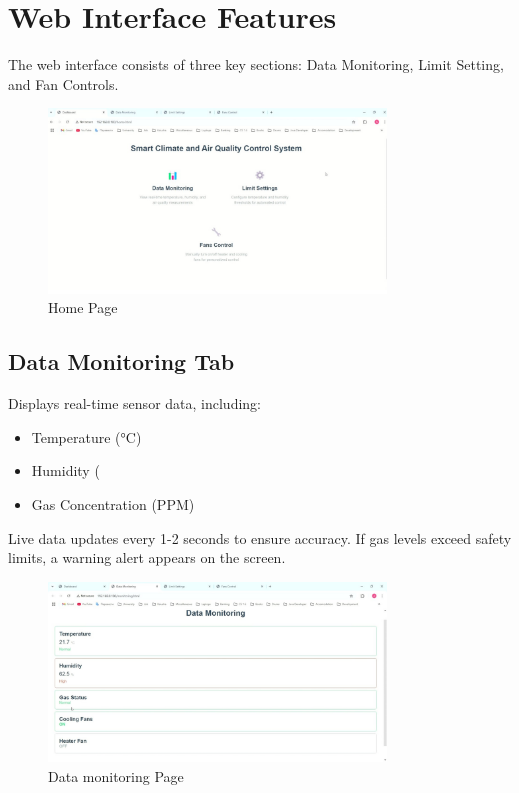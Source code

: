 \documentclass[a4paper]{scrartcl}
\begin{document}
\section{Web Interface Features}
The web interface consists of three key sections: Data Monitoring, Limit Setting, and Fan Controls.

\begin{figure}[H]
    \centering
    \includegraphics[width=0.8\textwidth]{images/HP.jpg}
    \caption{Home Page}
\end{figure}

\subsection{ Data Monitoring Tab}
Displays real-time sensor data, including:
\begin{itemize}
    \item Temperature (°C)
    \item Humidity (%
    \item Gas Concentration (PPM)
\end{itemize}
Live data updates every 1-2 seconds to ensure accuracy. If gas levels exceed safety limits, a warning alert appears on the screen.

\begin{figure}[H]
    \centering
    \includegraphics[width=0.8\textwidth]{images/DMP.jpg}
  \caption{Data monitoring Page}
\end{figure}
\end{document}
